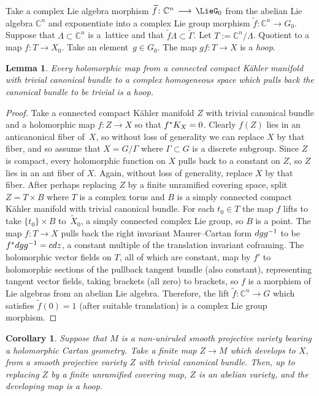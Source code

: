 \documentclass[11pt]{article}
\numberwithin{equation}{section}
\providecommand{\C}{\mathbb{C}}
\numberwithin{equation}{section}
\newtheorem{Corollary}[Theorem]{Corollary}
\newtheorem{Lemma}[Theorem]{Lemma}
\renewcommand{\C}{\mathbb{C}}
\newcommand{\GZ}{G_0}
\newcommand{\LieGZ}{\LieG_0}
\begin{document}
Take a complex Lie algebra morphism
$
\widetilde{f} \colon \C^{n} \to \LieGZ
$
from the abelian Lie algebra $\C^{n}$ and exponentiate into a complex Lie group morphism
$
\widetilde{f} \colon \C^{n} \to \GZ.
$
Suppose that $\Lambda \subset \C^{n}$ is a~lattice and that $\widetilde{f}\Lambda \subset \widetilde{\Gamma}$.
Let $T := \C^{n}/\Lambda$.
Quotient to a map $f \colon T \to X_0$.
Take an element~${g \in \GZ}$.
The map $gf \colon T \to X$ is a \emph{hoop}.

\begin{Lemma}\label{lemma:is.a.hoop}
Every holomorphic map from a connected compact K\"ahler manifold with trivial canonical bundle to a complex homogeneous space which pulls back the canonical bundle to be trivial is a hoop.
\end{Lemma}

\begin{proof}
Take a connected compact K\"ahler manifold $Z$ with trivial canonical bundle and a holomorphic map $f \colon Z \to X$ so that $f^* \cb{X}=0$.
Clearly $f(Z)$ lies in an anticanonical fiber of~$X$, so without loss of generality we can replace $X$ by that fiber, and so assume that $X=G/\Gamma$ where $\Gamma \subset G$ is a discrete subgroup.
Since $Z$ is compact, every holomorphic function on $X$ pulls back to a constant on $Z$, so $Z$ lies in an ant fiber of $X$.
Again, without loss of generality, replace $X$ by that fiber.
After perhaps replacing $Z$ by a finite unramified covering space, split~$Z = T \times B$ where $T$ is a complex torus and $B$ is a simply connected compact K\"ahler manifold with trivial canonical bundle.
For each $t_0 \in T$ the map $f$ lifts to take $\{t_0\} \times B$ to~$\widetilde{X}_0$, a simply connected complex Lie group, so $B$ is a point.
The map $f \colon T \to X$ pulls back the right invariant Maurer--Cartan form ${\rm d}g g^{-1}$ to be $f^* {\rm d}g g^{-1}
 = c {\rm d}z$, a constant multiple of the translation invariant coframing.
The holomorphic vector fields on $T$, all of which are constant, map by $f'$ to holomorphic sections of the pullback tangent bundle (also constant), representing tangent vector fields, taking brackets (all zero) to brackets, so $f$ is a morphism of Lie algebras from an abelian Lie algebra.
Therefore, the lift $\widetilde{f} \colon \C^{n} \to G$ which satisfies $\widetilde{f}(0)=1$ (after suitable translation) is a complex Lie group morphism.
\end{proof}
\begin{Corollary}\label{corollary:hoops}
Suppose that $M$ is a non-uniruled smooth projective variety bearing a holomorphic Cartan geometry.
Take a finite map $Z \to M$ which develops to $X$, from a smooth projective variety $Z$ with trivial canonical bundle.
Then, up to replacing $Z$ by a finite unramified covering map, $Z$ is an abelian variety, and the developing map is a hoop.
\end{Corollary}
\end{document}
